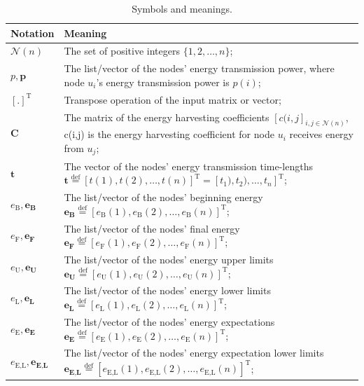 \documentclass[12pt,journal,onecolumn,draftcls]{IEEEtran}
\begin{document}
\begin{table}[!htbp]
\caption{Symbols and meanings.}
\centering
\label{T1}
\footnotesize{
\begin{tabular}
{|p{}|p{}|}
\hline
\hline
\textbf{Notation} & Meaning\\
\hline
\hline
$\mathcal{N}(n)$ & The set of positive integers $\{1,2,\ldots,n\}$;\\
\hline
$p, \mathbf{p}$ & The list/vector of the nodes' energy transmission power, where node $u_i$'s energy transmission power is $p(i)$;\\
\hline
$[.]^{\text{T}}$ & Transpose operation of the input matrix or vector;\\
\hline
$\mathbf{C}$ & The matrix of the energy harvesting coefficients $[c(i,j]_{i,j{\in}\mathcal{N}(n)}$, c(i,j) is the energy harvesting coefficient for node $u_i$ receives energy from $u_j$;\\
\hline
$\mathbf{t}$ & The vector of the nodes' energy transmission time-lengths $\mathbf{t}{\mathop{=}\limits^\text{def}}[t(1),t(2),\ldots,t(n)]^{\text{T}}{=}[t_1),t_2),\ldots,t_n]^{\text{T}}$;\\
\hline
$e_\text{B}, \mathbf{e_\text{B}}$ & The list/vector of the nodes' beginning energy $\mathbf{e_\text{B}}{\mathop{=}\limits^\text{def}}[e_\text{B}(1),e_\text{B}(2),\ldots,e_\text{B}(n)]^{\text{T}}$;\\
\hline
$e_\text{F}, \mathbf{e_\text{F}}$ & The list/vector of the nodes' final energy $\mathbf{e_\text{F}}{\mathop{=}\limits^\text{def}}[e_\text{F}(1),e_\text{F}(2),\ldots,e_\text{F}(n)]^{\text{T}}$;\\
\hline
$e_\text{U}, \mathbf{e_\text{U}}$ & The list/vector of the nodes' energy upper limits $\mathbf{e_\text{U}}{\mathop{=}\limits^\text{def}}[e_\text{U}(1),e_\text{U}(2),\ldots,e_\text{U}(n)]^{\text{T}}$;\\
\hline
$e_\text{L}, \mathbf{e_\text{L}}$ & The list/vector of the nodes' energy lower limits $\mathbf{e_\text{L}}{\mathop{=}\limits^\text{def}}[e_\text{L}(1),e_\text{L}(2),\ldots,e_\text{L}(n)]^{\text{T}}$;\\
\hline
$e_\text{E}, \mathbf{e_\text{E}}$ & The list/vector of the nodes' energy expectations $\mathbf{e_\text{E}}{\mathop{=}\limits^\text{def}}[e_\text{E}(1),e_\text{E}(2),\ldots,e_\text{E}(n)]^{\text{T}}$;\\
\hline
$e_\text{E,L}, \mathbf{e_\text{E,L}}$ & The list/vector of the nodes' energy expectation lower limits $\mathbf{e_\text{E,L}}{\mathop{=}\limits^\text{def}}[e_\text{E,L}(1),e_\text{E,L}(2),\ldots,e_\text{E,L}(n)]^{\text{T}}$;\\

\end{tabular}}
\end{table}
\end{document}
